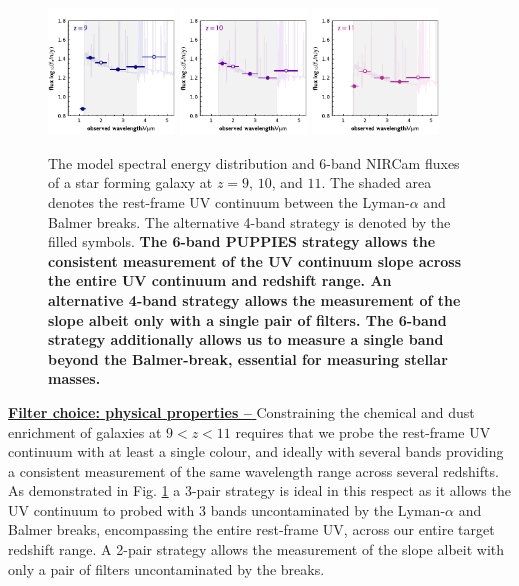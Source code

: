 \documentclass[12pt]{article}
\begin{document}
\begin{figure}[h!]
    \centering
    \includegraphics[width=0.3\textwidth]{figs/SED_9.pdf}
    \includegraphics[width=0.3\textwidth]{figs/SED_10.pdf}
    \includegraphics[width=0.3\textwidth]{figs/SED_11.pdf}
    \caption{The model spectral energy distribution and 6-band NIRCam fluxes of a star forming galaxy at $z=9$, $10$, and $11$. The shaded area denotes the rest-frame UV continuum between the Lyman-$\alpha$ and Balmer breaks. The alternative 4-band strategy is denoted by the filled symbols. \textbf{The 6-band PUPPIES strategy allows the consistent measurement of the UV continuum slope across the entire UV continuum and redshift range. An alternative 4-band strategy allows the measurement of the slope albeit only with a single pair of filters. The 6-band strategy additionally allows us to measure a single band beyond the Balmer-break, essential for measuring stellar masses.}}
    \label{fig:SED}
\end{figure}

\noindent
\underline{\bf Filter choice: physical properties -- } Constraining the chemical and dust enrichment of galaxies at $9<z<11$ requires that we probe the rest-frame UV continuum with at least a single colour, and ideally with several bands providing a consistent measurement of the same wavelength range across several redshifts. As demonstrated in Fig. \ref{fig:SED} a 3-pair strategy is ideal in this respect as it allows the UV continuum to probed with 3 bands uncontaminated by the Lyman-$\alpha$ and Balmer breaks, encompassing the entire rest-frame UV, across our entire target redshift range. A 2-pair strategy allows the measurement of the slope albeit with only a pair of filters uncontaminated by the breaks. 
\end{document}
